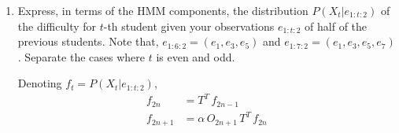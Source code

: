 \documentclass[11pt, a4paper]{article}
\begin{document}
\begin{enumerate}
\begin{solution}
\begin{figure}[h]
    \end{figure}
    \end{solution}

    \item Express, in terms of the HMM components, the distribution $P(X_t | e_{1:t:2})$ of the difficulty for $t$-th student given your observations $e_{1:t:2}$ of half of the previous students. Note that, $e_{1:6:2} = (e_1, e_3, e_5)$ and $e_{1:7:2} = (e_1, e_3, e_5, e_7)$. Separate the cases where $t$ is even and odd.

    \begin{solution}
        Denoting $f_t = P(X_t | e_{1:t:2})$,
        \begin{align*}
            f_{2n} & = T^T \, f_{2n-1} \\
            f_{2n + 1} & = \alpha \, O_{2n+1} \, T^T \, f_{2n}
        \end{align*}
    \end{solution}


\end{enumerate}
\end{document}
